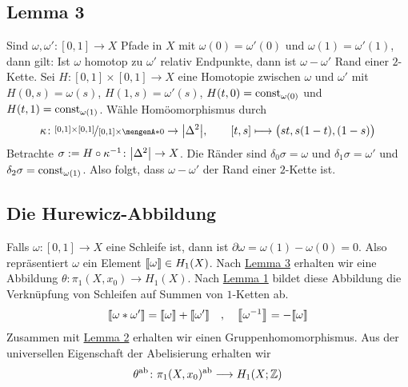 \subsection{Lemma 3} %
\label{sub:158}
Sind $\omega,\omega' \colon [0,1] \to X$ Pfade in $X$ mit $\omega(0)=\omega'(0)$ und $\omega(1)= \omega'(1)$, dann gilt: Ist $\omega$ homotop zu $\omega'$ relativ Endpunkte, 
dann ist $\omega- \omega'$ Rand einer $2$-Kette.
Sei $H \colon [0,1] \times [0,1] \to X$ eine Homotopie zwischen $\omega$ und $\omega'$ mit $H(0,s) = \omega(s)$, $H(1,s)=\omega'(s)$, $H(t,0)=\mathrm{const}_{\omega(0)}$ und
$H(t,1)= \mathrm{const}_{\omega(1)}$.
Wähle Homöomorphismus durch
\[
	\kappa \colon \nicefrac{[0,1] \times [0,1]}{[0,1] \times \set{0}} \to \abs*{\Delta^2} , \qquad [t,s] \longmapsto \enbrace[\big]{st, s(1-t), (1-s)}
\]
Betrachte $\sigma := H \circ \kappa ^{-1} \colon \abs*{\Delta^2} \to X$. Die Ränder sind $\delta_0 \sigma = \omega$ und $\delta_1 \sigma = \omega'$ und
$\delta_2 \sigma = \mathrm{const}_{\omega(1)}$. Also folgt, dass $\omega- \omega'$ der Rand einer $2$-Kette ist.

\subsection{Die Hurewicz-Abbildung} %
\label{sub:159}
Falls $\omega \colon [0,1] \to X$ eine Schleife ist, dann ist $\partial \omega = \omega(1)- \omega(0)=0$. Also repräsentiert $\omega$ ein Element 
$\llbracket\omega\rrbracket \in H_1(X)$. Nach \hyperref[sub:158]{Lemma 3} erhalten wir eine Abbildung $\theta \colon \pi_1(X,x_0) \to H_1(X)$. Nach \hyperref[sub:156]{Lemma 1} bildet diese
Abbildung die Verknüpfung von Schleifen auf Summen von $1$-Ketten ab.
\begin{align*}
	\homologieklasse*{\omega * \omega'} = \homologieklasse*{\omega} + \homologieklasse*{\omega'} \quad ,\quad  \homologieklasse*{\omega ^{-1}} = - \homologieklasse*{\omega}
\end{align*}
Zusammen mit \hyperref[sub:157]{Lemma 2} erhalten wir einen Gruppenhomomorphismus. Aus der universellen Eigenschaft der Abelisierung erhalten wir 
\[
	\theta^{\mathrm{ab}} \colon \pi_1(X,x_0)^{\mathrm{ab}} \longrightarrow H_1(X;\mathbb{Z})
\]

